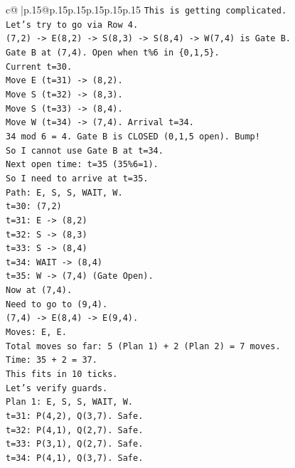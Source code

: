\documentclass{article}
\begin{document}
{\begin{supertabular}{c@{$\;$}|p{.15\linewidth}@{}p{.15\linewidth}p{.15\linewidth}p{.15\linewidth}p{.15\linewidth}p{.15\linewidth}}
{{{\texttt{This is getting complicated.} \\
\texttt{Let's try to go via Row 4.} \\
\texttt{(7,2) {-}> E(8,2) {-}> S(8,3) {-}> S(8,4) {-}> W(7,4) is Gate B.} \\
\texttt{Gate B at (7,4). Open when t\%6 in \{0,1,5\}.} \\
\texttt{Current t=30.} \\
\texttt{Move E (t=31) {-}> (8,2).} \\
\texttt{Move S (t=32) {-}> (8,3).} \\
\texttt{Move S (t=33) {-}> (8,4).} \\
\texttt{Move W (t=34) {-}> (7,4). Arrival t=34.} \\
\texttt{34 mod 6 = 4. Gate B is CLOSED (0,1,5 open). Bump!} \\
\texttt{So I cannot use Gate B at t=34.} \\
\texttt{Next open time: t=35 (35\%6=1).} \\
\texttt{So I need to arrive at t=35.} \\
\texttt{Path: E, S, S, WAIT, W.} \\
\texttt{t=30: (7,2)} \\
\texttt{t=31: E {-}> (8,2)} \\
\texttt{t=32: S {-}> (8,3)} \\
\texttt{t=33: S {-}> (8,4)} \\
\texttt{t=34: WAIT {-}> (8,4)} \\
\texttt{t=35: W {-}> (7,4) (Gate Open).} \\
\texttt{Now at (7,4).} \\
\texttt{Need to go to (9,4).} \\
\texttt{(7,4) {-}> E(8,4) {-}> E(9,4).} \\
\texttt{Moves: E, E.} \\
\texttt{Total moves so far: 5 (Plan 1) + 2 (Plan 2) = 7 moves.} \\
\texttt{Time: 35 + 2 = 37.} \\
\texttt{This fits in 10 ticks.} \\
\texttt{Let's verify guards.} \\
\texttt{Plan 1: E, S, S, WAIT, W.} \\
\texttt{t=31: P(4,2), Q(3,7). Safe.} \\
\texttt{t=32: P(4,1), Q(2,7). Safe.} \\
\texttt{t=33: P(3,1), Q(2,7). Safe.} \\
\texttt{t=34: P(4,1), Q(3,7). Safe.} \\
}}}
\end{supertabular}}
\end{document}
